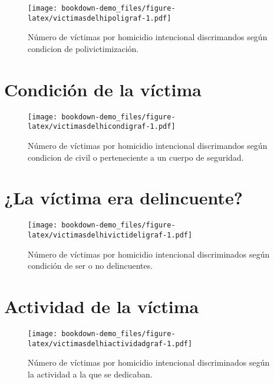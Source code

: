 \documentclass[
]{book}
\begin{document}
\begin{figure}
\centering
\texttt{[image: bookdown-demo\_files/figure-latex/victimasdelhipoligraf-1.pdf]}
\caption{\label{fig:victimasdelhipoligraf}Número de víctimas por homicidio intencional discrimandos según condicion de polivictimización.}
\end{figure}

\hypertarget{condiciuxf3n-de-la-vuxedctima-1}{%
\section{Condición de la víctima}\label{condiciuxf3n-de-la-vuxedctima-1}}



\begin{figure}
\centering
\texttt{[image: bookdown-demo\_files/figure-latex/victimasdelhicondigraf-1.pdf]}
\caption{\label{fig:victimasdelhicondigraf}Número de víctimas por homicidio intencional discrimandos según condicion de civil o perteneciente a un cuerpo de seguridad.}
\end{figure}

\hypertarget{la-vuxedctima-era-delincuente-1}{%
\section{¿La víctima era delincuente?}\label{la-vuxedctima-era-delincuente-1}}



\begin{figure}
\centering
\texttt{[image: bookdown-demo\_files/figure-latex/victimasdelhivictideligraf-1.pdf]}
\caption{\label{fig:victimasdelhivictideligraf}Número de víctimas por homicidio intencional discriminados según condición de ser o no delincuentes.}
\end{figure}

\hypertarget{actividad-de-la-vuxedctima-1}{%
\section{Actividad de la víctima}\label{actividad-de-la-vuxedctima-1}}



\begin{figure}
\centering
\texttt{[image: bookdown-demo\_files/figure-latex/victimasdelhiactividadgraf-1.pdf]}
\caption{\label{fig:victimasdelhiactividadgraf}Número de víctimas por homicidio intencional discriminados según la actividad a la que se dedicaban.}
\end{figure}
\end{document}
